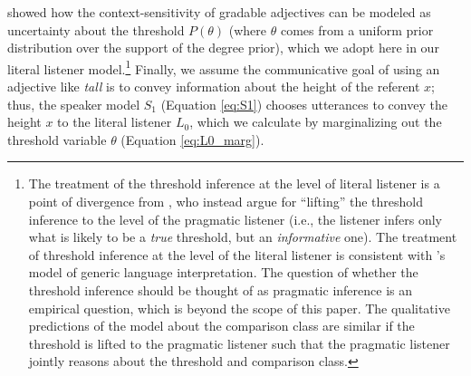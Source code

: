 \documentclass[doc]{apa6}
\newcommand{\red}[1]{\textcolor{Red}{#1}}
\begin{document}
 showed how the context-sensitivity of gradable adjectives can be modeled as uncertainty about the threshold $P(\theta)$ (where $\theta$ comes from a uniform prior distribution over the support of the degree prior), which we adopt here in our literal listener model.\footnote{
	The treatment of the threshold inference at the level of literal listener is a point of divergence from , who instead argue for ``lifting'' the threshold inference to the level of the pragmatic listener (i.e., the listener infers only what is likely to be a \emph{true} threshold, but an \emph{informative} one). The treatment of threshold inference at the level of the literal listener is consistent with 's model of generic language interpretation.
	The question of whether the threshold inference should be thought of as pragmatic inference is an empirical question, which is beyond the scope of this paper.  The qualitative predictions of the model about the comparison class are similar if the threshold is lifted to the pragmatic listener such that the pragmatic listener jointly reasons about the threshold and comparison class.
}
Finally, we assume the communicative goal of using an adjective like \emph{tall} is to convey information about the height of the referent $x$; thus, the speaker model $S_1$ (Equation \ref{eq:S1}) chooses utterances to convey the height $x$ to the literal listener $L_0$, which we calculate by marginalizing out the threshold variable $\theta$ (Equation \ref{eq:L0_marg}).
\end{document}
